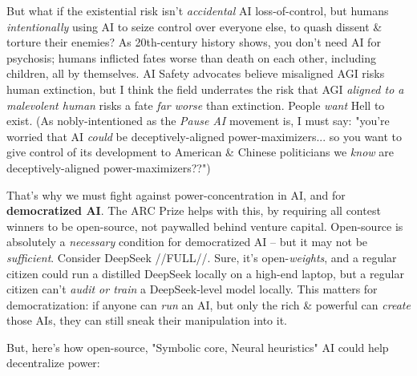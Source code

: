 \documentclass{article}
\begin{document}
But what if the existential risk isn't \textit{accidental} AI loss-of-control, but humans \textit{intentionally} using AI to seize control over everyone else, to quash dissent \& torture their enemies? As 20th-century history shows, you don't need AI for psychosis; humans inflicted fates worse than death on each other, including children, all by themselves. AI Safety advocates believe misaligned AGI risks human extinction, but I think the field underrates the risk that AGI \textit{aligned to a malevolent human} risks a fate \textit{far worse} than extinction. People \textit{want} Hell to exist. (As nobly-intentioned as the \textit{Pause AI} movement is, I must say: "you're worried that AI \textit{could} be deceptively-aligned power-maximizers... so you want to give control of its development to American \& Chinese politicians we \textit{know} are deceptively-aligned power-maximizers??")

That's why we must fight against power-concentration in AI, and for \textbf{democratized AI}. The ARC Prize helps with this, by requiring all contest winners to be open-source, not paywalled behind venture capital. Open-source is absolutely a \textit{necessary} condition for democratized AI -- but it may not be \textit{sufficient}. Consider DeepSeek //FULL//. Sure, it's open-\textit{weights}, and a regular citizen could run a distilled DeepSeek locally on a high-end laptop, but a regular citizen can't \textit{audit or train} a DeepSeek-level model locally. This matters for democratization: if anyone can \textit{run} an AI, but only the rich \& powerful can \textit{create} those AIs, they can still sneak their manipulation into it.

But, here's how open-source, "Symbolic core, Neural heuristics" AI could help decentralize power:
\end{document}
